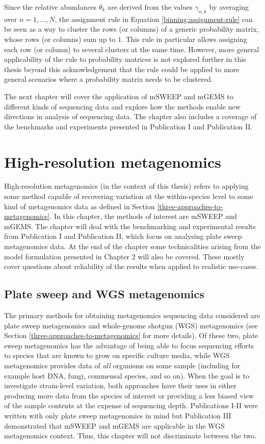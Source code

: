 \documentclass[officiallayout]{tktla}
\begin{document}
Since the relative abundances $\theta_k$ are derived from the values
$\gamma_{n, k}$ by averaging over $n = 1, \dots, N$, the assignment
rule in Equation \eqref{binning:assignment-rule} can be seen as a way to
cluster the rows (or columns) of a generic probability matrix, whose
rows (or columns) sum up to $1$. This rule in particular allows
assigning each row (or column) to several clusters at the same
time. However, more general applicability of the rule to probability
matrices is not explored further in this thesis beyond this
acknowledgement that the rule could be applied to more general
scenarios where a probability matrix needs to be clustered.

The next chapter will cover the application of mSWEEP and mGEMS to
different kinds of sequencing data and explore how the methods enable
new directions in analysis of sequencing data. The chapter also
includes a coverage of the benchmarks and experiments presented in
Publication I and Publication II.

\chapter{High-resolution metagenomics}
\label{high-resolution-metagenomics}

High-resolution metagenomics (in the context of this thesis) refers to
applying some method capable of recovering variation at the
within-species level to some kind of metagenomics data as defined in
Section \ref{three-approaches-to-metagenomics}. In this chapter, the
methods of interest are mSWEEP and mGEMS. The chapter will deal with
the benchmarking and experimental results from Publication I and
Publication II, which focus on analysing plate sweep metagenomics
data. At the end of the chapter some technicalities arising from the
model formulation presented in Chapter 2 will also be covered. These
mostly cover questions about reliability of the results when applied
to realistic use-cases.

\section{Plate sweep and WGS metagenomics}

The primary methods for obtaining metagenomics sequencing data
considered are plate sweep metagenomics and whole-genome shotgun (WGS)
metagenomics (see Section \ref{three-approaches-to-metagenomics} for
more details). Of these two, plate sweep metagenomics has the
advantage of being able to focus sequencing efforts to species that
are known to grow on specific culture media, while WGS metagenomics
provides data of \textit{all} organisms on some sample (including for
example host DNA, fungi, commensal species, and so on). When the goal
is to investigate strain-level variation, both approaches have their
uses in either producing more data from the species of interest or
providing a less biased view of the sample contents at the expense of
sequencing depth. Publications I-II were written with only plate sweep
metagenomics in mind but Publication III demonstrated that mSWEEP and
mGEMS are applicable in the WGS metagenomics context. Thus, this
chapter will not discriminate between the two.
\end{document}
